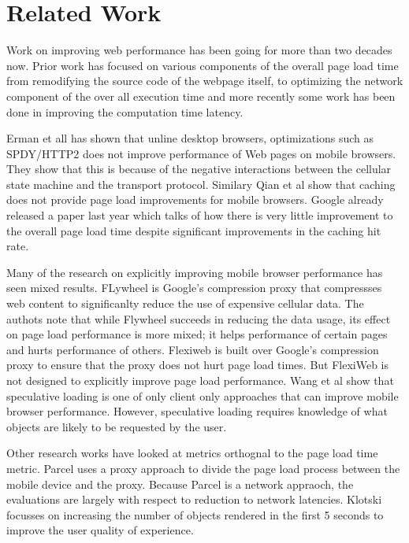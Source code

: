 \section{Related Work}
\label{sec:related}

Work on improving web performance has been going for more than two decades now. 
Prior work has focused on various components of the overall page load time
from remodifying the source code of the webpage itself, to optimizing the
network component of the over all execution time and more recently some work
has been done in improving the computation time latency. 

Erman et all \cite{erman2013conext} %
has shown that unline desktop browsers, optimizations such as SPDY/HTTP2 does not improve
performance of Web pages on mobile browsers. They show that this is because of the negative interactions
between the cellular state machine and the transport protocol. Similary Qian
et al \cite{quian2012mobisys} %
show that caching does not provide
page load improvements for mobile browsers. 
Google already released a paper last year \cite{vesuna2016caching} %
which talks of how there is very little improvement to the overall page load time despite 
significant improvements in the caching hit rate. 

Many of the research on explicitly improving mobile browser performance has seen mixed results.
FLywheel \cite{agababov2015nsdi} is Google's compression proxy that compressses web content to significanlty 
reduce the use of expensive cellular data. The authots note that while Flywheel succeeds in
reducing the data usage, its effect on page load performance is more mixed; it helps
performance of certain pages and hurts performance of others. Flexiweb \cite{singh2015mobicom} is built over
Google's compression proxy to ensure that the proxy does not hurt page load times. But FlexiWeb
is not designed to explicitly improve page load performance. Wang et al \cite{wang2013demystifying} show that
speculative loading is one of only client only approaches that can improve mobile
browser performance. However, speculative loading requires knowledge of what objects are likely
to be requested by the user. 

Other research works have looked at metrics orthognal to the page load time metric. Parcel
\cite{sivakumar2014conext} %
 uses a proxy
approach to divide the page load process between the mobile device and the proxy. Because Parcel is
a network appraoch, the evaluations are largely with respect to reduction to network
latencies. Klotski \cite{butkiewicz2015usenix} focusses on increasing the number of objects rendered in the first
5 seconds to improve the user quality of experience. 

